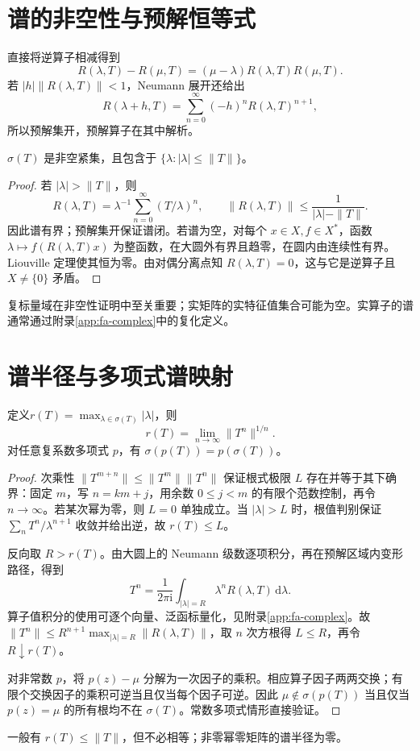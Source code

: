 \documentclass[UTF8,12pt,a4paper,fontset=fandol]{ctexbook}
\begin{document}
\section{谱的非空性与预解恒等式}
直接将逆算子相减得到
\[
 R(\lambda,T)-R(\mu,T)=(\mu-\lambda)R(\lambda,T)R(\mu,T).
\]
若 $|h|\|R(\lambda,T)\|<1$，Neumann 展开还给出
\[
 R(\lambda+h,T)=\sum_{n=0}^{\infty}(-h)^nR(\lambda,T)^{n+1},
\]
所以预解集开，预解算子在其中解析。

\begin{theorem}\label{thm:fa-spectrum-compact}
$\sigma(T)$ 是非空紧集，且包含于 $\{\lambda:|\lambda|\leq\|T\|\}$。
\end{theorem}
\begin{proof}
若 $|\lambda|>\|T\|$，则
\[
 R(\lambda,T)=\lambda^{-1}\sum_{n=0}^{\infty}(T/\lambda)^n,
 \qquad\|R(\lambda,T)\|\leq\frac1{|\lambda|-\|T\|}.
\]
因此谱有界；预解集开保证谱闭。若谱为空，对每个 $x\in X,f\in X^*$，函数 $\lambda\mapsto f(R(\lambda,T)x)$ 为整函数，在大圆外有界且趋零，在圆内由连续性有界。Liouville 定理使其恒为零。由对偶分离点知 $R(\lambda,T)=0$，这与它是逆算子且 $X\ne\{0\}$ 矛盾。
\end{proof}
复标量域在非空性证明中至关重要；实矩阵的实特征值集合可能为空。实算子的谱通常通过附录\ref{app:fa-complex}中的复化定义。

\section{谱半径与多项式谱映射}
\begin{theorem}\label{thm:fa-spectral-radius}
定义$r(T)=\max_{\lambda\in\sigma(T)}|\lambda|$，则
\begin{equation}
 r(T)=\lim_{n\to\infty}\|T^n\|^{1/n}.
 \label{eq:fa-spectral-radius}
\end{equation}
对任意复系数多项式 $p$，有 $\sigma(p(T))=p(\sigma(T))$。
\end{theorem}
\begin{proof}
次乘性 $\|T^{m+n}\|\leq\|T^m\|\|T^n\|$ 保证根式极限 $L$ 存在并等于其下确界：固定 $m$，写 $n=km+j$，用余数 $0\leq j<m$ 的有限个范数控制，再令 $n\to\infty$。若某次幂为零，则 $L=0$ 单独成立。当 $|\lambda|>L$ 时，根值判别保证 $\sum_nT^n/\lambda^{n+1}$ 收敛并给出逆，故 $r(T)\leq L$。

反向取 $R>r(T)$。由大圆上的 Neumann 级数逐项积分，再在预解区域内变形路径，得到
\[
 T^n=\frac1{2\pi\mathrm i}\int_{|\lambda|=R}\lambda^nR(\lambda,T)\,\mathrm d\lambda.
\]
算子值积分的使用可逐个向量、泛函标量化，见附录\ref{app:fa-complex}。故 $\|T^n\|\leq R^{n+1}\max_{|\lambda|=R}\|R(\lambda,T)\|$，取 $n$ 次方根得 $L\leq R$，再令 $R\downarrow r(T)$。

对非常数 $p$，将 $p(z)-\mu$ 分解为一次因子的乘积。相应算子因子两两交换；有限个交换因子的乘积可逆当且仅当每个因子可逆。因此 $\mu\notin\sigma(p(T))$ 当且仅当 $p(z)=\mu$ 的所有根均不在 $\sigma(T)$。常数多项式情形直接验证。
\end{proof}
一般有 $r(T)\leq\|T\|$，但不必相等；非零幂零矩阵的谱半径为零。
\end{document}
